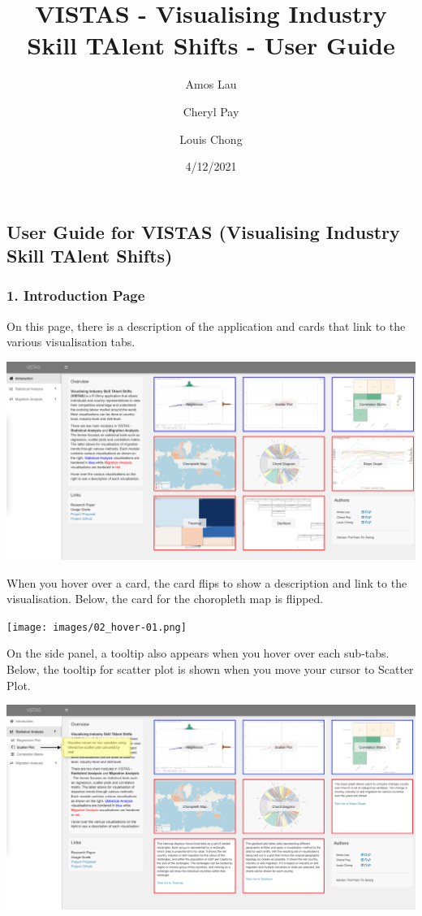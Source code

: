 \documentclass[
]{article}
\title{VISTAS - Visualising Industry Skill TAlent Shifts - User Guide}
\author{Amos Lau \and Cheryl Pay \and Louis Chong}
\date{4/12/2021}
\begin{document}
\maketitle

\hypertarget{user-guide-for-vistas-visualising-industry-skill-talent-shifts}{%
\subsection{User Guide for VISTAS (Visualising Industry Skill TAlent
Shifts)}\label{user-guide-for-vistas-visualising-industry-skill-talent-shifts}}

\hypertarget{introduction-page}{%
\subsubsection{1. Introduction Page}\label{introduction-page}}

On this page, there is a description of the application and cards that
link to the various visualisation tabs.

\includegraphics[width=1\textwidth,height=\textheight]{images/01_introduction.png}

When you hover over a card, the card flips to show a description and
link to the visualisation. Below, the card for the choropleth map is
flipped.

\texttt{[image: images/02\_hover-01.png]}

On the side panel, a tooltip also appears when you hover over each
sub-tabs. Below, the tooltip for scatter plot is shown when you move
your cursor to Scatter Plot.

\includegraphics{images/03-tooltip.png}
\end{document}
